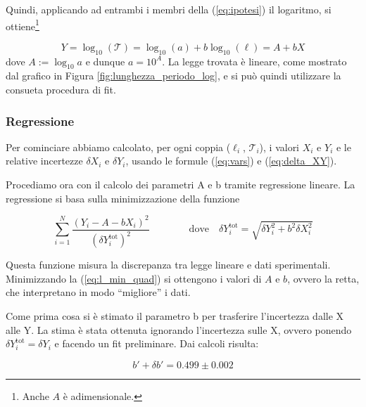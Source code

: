 Quindi, applicando ad entrambi i membri della (\ref{eq:ipotesi}) il logaritmo, si ottiene\footnote{
Anche $A$ è adimensionale.}

\begin{equation}
    Y = \log_{10} (\mathcal{T}) = \log_{10} (a) + b \log_{10} (\ell) = A + b X
\end{equation}
%
dove $A := \log_{10} a$ e dunque $a = 10^A$. La legge trovata è lineare, come mostrato dal grafico
in Figura \ref{fig:lunghezza_periodo_log}, e si può quindi utilizzare la consueta procedura di fit.


\subsubsection{Regressione}
\label{l_regressione}

Per cominciare abbiamo calcolato, per ogni coppia ($\ell_i$, $\mathcal{T}_i$), i valori $X_i$ e $Y_i$
e le relative incertezze $\delta X_i$ e $\delta Y_i$, usando le formule (\ref{eq:vars}) e (\ref{eq:delta_XY}).

Procediamo ora con il calcolo dei parametri A e b tramite regressione lineare. 
La regressione si basa sulla minimizzazione della funzione

\begin{equation}
    \sum_{i=1}^N \frac{(Y_i - A - bX_i)^2}{(\delta Y_i^{\text{tot}})^2}
    \qquad \qquad \text{dove} \quad
    \delta Y_i^{\text{tot}} = \sqrt{\delta Y_i^2 + b^2 \delta X_i^2}
    \label{eq:l_min_quad}
\end{equation}

Questa funzione misura la discrepanza tra legge lineare e dati sperimentali. Minimizzando la (\ref{eq:l_min_quad}) si ottengono
i valori di $A$ e $b$, ovvero la retta, che interpretano in modo ``migliore'' i dati.

Come prima cosa si è stimato il parametro b per trasferire l'incertezza dalle X alle Y.
La stima è stata ottenuta ignorando l'incertezza sulle X, ovvero ponendo $\delta Y_i^{\text{tot}} = \delta Y_i$ e facendo un fit preliminare.
Dai calcoli risulta:

\begin{equation}
    b' + \delta b' = 0.499 \pm 0.002
\end{equation}

